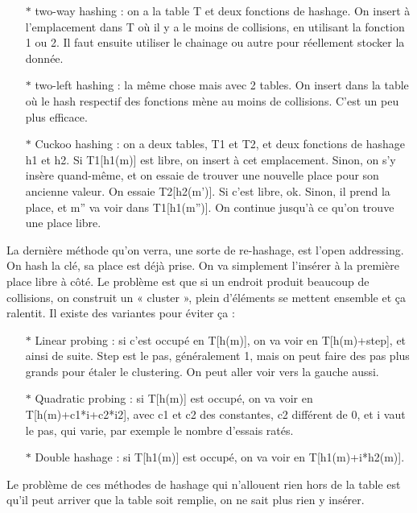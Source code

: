 \documentclass[10pt]{article}
\begin{document}
\begin{itemize}
	\item[$*$] two-way hashing : on a la table T et deux fonctions de hashage. On insert à l'emplacement dans T où il y a le moins de collisions, en utilisant la fonction 1 ou 2. Il faut ensuite utiliser le chainage ou autre pour réellement stocker la donnée. 
	\item[$*$] two-left hashing : la même chose mais avec 2 tables. On insert dans la table où le hash respectif des fonctions mène au moins de collisions. C'est un peu plus efficace. 
	\item[$*$] Cuckoo hashing : on a deux tables, T1 et T2, et deux fonctions de hashage h1 et h2. Si T1[h1(m)] est libre, on insert à cet emplacement. Sinon, on s'y insère quand-même, et on essaie de trouver une nouvelle place pour son ancienne valeur. On essaie T2[h2(m')]. Si c'est libre, ok. Sinon, il prend la place, et m” va voir dans T1[h1(m”)]. On continue jusqu'à ce qu'on trouve une place libre. 
\end{itemize}
 La dernière méthode qu'on verra, une sorte de re-hashage, est l'open addressing. On hash la clé, sa place est déjà prise. On va simplement l'insérer à la première place libre à côté. Le problème est que si un endroit produit beaucoup de collisions, on construit un « cluster », plein d'éléments se mettent ensemble et ça ralentit. Il existe des variantes pour éviter ça :  
\begin{itemize}
	\item[$*$] Linear probing : si c'est occupé en T[h(m)], on va voir en T[h(m)+step], et ainsi de suite. Step est le pas, généralement 1, mais on peut faire des pas plus grands pour étaler le clustering. On peut aller voir vers la gauche aussi.
	\item[$*$] Quadratic probing : si T[h(m)] est occupé, on va voir en T[h(m)+c1*i+c2*i2], avec c1 et c2 des constantes, c2 différent de 0, et i vaut le pas, qui varie, par exemple le nombre d'essais ratés. 
	\item[$*$] Double hashage : si T[h1(m)] est occupé, on va voir en T[h1(m)+i*h2(m)].  
\end{itemize}	
Le problème de ces méthodes de hashage qui n'allouent rien hors de la table est qu'il peut arriver que la table soit remplie, on ne sait plus rien y insérer.
\newpage
\end{document}

